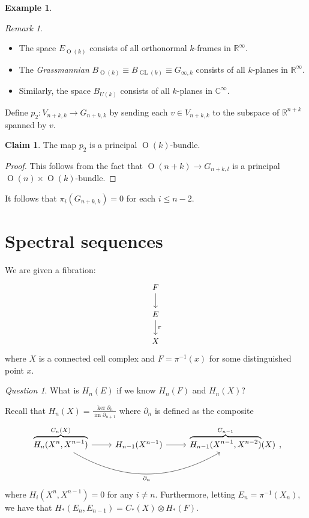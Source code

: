 \documentclass[10pt,letterpaper,cm]{nupset}
\theoremstyle{definition}
\newtheorem{exmp}[defn]{Example}
\theoremstyle{theorem}
\newtheorem*{claim}{Claim}
\theoremstyle{remark}
\newtheorem{remark}[defn]{Remark}
\newtheorem*{question}{Question}
\newcommand{\C}{\mathbb C}
\newcommand{\R}{\mathbb{R}}
\newcommand{\1}{\mathbb{1}}
\newcommand{\0}{\vec 0}
\DeclareMathOperator{\im}{im}
\DeclareMathOperator{\GL}{GL}
\DeclareMathOperator{\Or}{O}
\newcommand{\bi}{\begin{itemize}}
\newcommand{\ei}{\end{itemize}}
\begin{document}
\begin{exmp}
\begin{remark} $ $
\bi
\item  The space $E_{\Or(k)}$ consists of all orthonormal $k$-frames in $\R^{\infty}$. 
\item The \textit{Grassmannian}  $B_{\Or(k)} \equiv B_{\GL(k)} \equiv G_{\infty, k}$ consists of all $k$-planes in $\R^{\infty}$. 
\item Similarly, the space $B_{U(k)}$ consists of all $k$-planes in $\C^{\infty}$.
\ei
\end{remark}

\smallskip

Define $p_2: V_{n+k, k} \to G_{n+k, k}$ by sending each $v \in V_{n+k, k}$ to the subspace of $\R^{n+k}$ spanned by $v$. 
\begin{claim}
The map $p_2$ is a principal $\Or(k)$-bundle.
\end{claim}
\begin{proof}
This follows from the fact that $\Or(n + k) \to G_{n+k, l}$ is a principal $\Or(n) \times \Or(k)$-bundle.
\end{proof}

It follows that $\pi_i(G_{n+k, k}) =0$ for each $i\leq n-2$.
\end{exmp}

\section{Spectral sequences}

We are given a  fibration:
\[
\begin{tikzcd}
F \arrow[d]        \\
E \arrow[d, "\pi"] \\
X                 
\end{tikzcd}
\]
where $X$ is a connected cell complex and $F= \pi^{-1}(x)$ for some distinguished point $x$. 

\begin{question}
What is $H_n(E)$ if we know $H_n(F)$ and $H_n(X)$?
\end{question}

Recall that $H_n(X) = \frac{\ker{\partial_n}}{\im{\partial_{n+1}}}$ where $\partial_n$ is defined as the composite
\[
\begin{tikzcd}
{\overbrace{H_n(X^n, X^{n-1})}^{C_n(X)}} \arrow[r] \arrow[rr, "\partial_n"', bend right] & H_{n-1}(X^{n-1}) \arrow[r] & {\overbrace{H_{n-1}(X^{n-1}, X^{n-2})}^{C_{n-1}}(X)}
\end{tikzcd},
\]
where $H_i(X^n, X^{n-1})=0$ for any $i\ne n$. Furthermore, letting $E_n = \pi^{-1}(X_n)$, we have that $H_{\ast}(E_n, E_{n-1}) = C_{\ast}(X) \otimes H_{\ast}(F)$.
\end{document}

